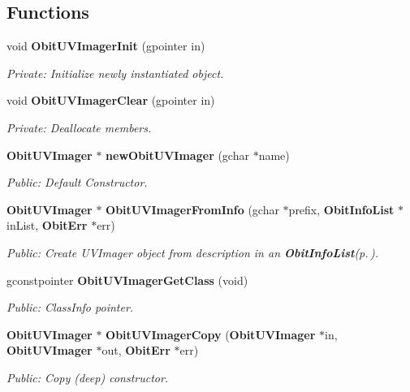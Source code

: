 \subsection*{Functions}
\begin{CompactItemize}
\item 
void {\bf Obit\-UVImager\-Init} (gpointer in)
\begin{CompactList}\small\item\em Private: Initialize newly instantiated object. \item\end{CompactList}\item 
void {\bf Obit\-UVImager\-Clear} (gpointer in)
\begin{CompactList}\small\item\em Private: Deallocate members. \item\end{CompactList}\item 
{\bf Obit\-UVImager} $\ast$ {\bf new\-Obit\-UVImager} (gchar $\ast$name)
\begin{CompactList}\small\item\em Public: Default Constructor. \item\end{CompactList}\item 
{\bf Obit\-UVImager} $\ast$ {\bf Obit\-UVImager\-From\-Info} (gchar $\ast$prefix, {\bf Obit\-Info\-List} $\ast$in\-List, {\bf Obit\-Err} $\ast$err)
\begin{CompactList}\small\item\em Public: Create UVImager object from description in an {\bf Obit\-Info\-List}{\rm (p.\,\pageref{structObitInfoList})}. \item\end{CompactList}\item 
gconstpointer {\bf Obit\-UVImager\-Get\-Class} (void)
\begin{CompactList}\small\item\em Public: Class\-Info pointer. \item\end{CompactList}\item 
{\bf Obit\-UVImager} $\ast$ {\bf Obit\-UVImager\-Copy} ({\bf Obit\-UVImager} $\ast$in, {\bf Obit\-UVImager} $\ast$out, {\bf Obit\-Err} $\ast$err)
\begin{CompactList}\small\item\em Public: Copy (deep) constructor. \item\end{CompactList}\item 

\end{CompactItemize}
